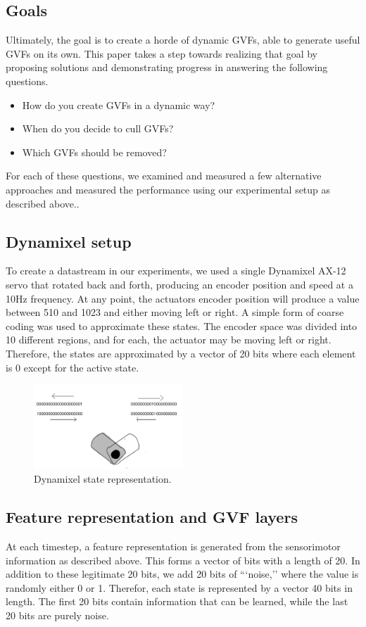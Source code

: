 \documentclass[letterpaper]{article}
\begin{document}
\subsection{Goals}
Ultimately, the goal is to create a horde of dynamic GVFs, able to generate useful GVFs on its own. This paper takes a step towards realizing that goal by proposing solutions and demonstrating progress in answering the following questions.
\begin{itemize}
  \item How do you create GVFs in a dynamic way?
  \item When do you decide to cull GVFs?
  \item Which GVFs should be removed?
\end{itemize}

For each of these questions, we examined and measured a few alternative approaches and measured the performance using our experimental setup as described above..

\subsection{Dynamixel setup}
To create a datastream in our experiments, we used a single Dynamixel AX-12 servo that rotated back and forth, producing an encoder position and speed at a 10Hz frequency. At any point, the actuators encoder position will produce a value between 510 and 1023 and either moving left or right. A simple form of coarse coding was used to approximate these states. The encoder space was divided into 10 different regions, and for each, the actuator may be moving left or right. Therefore, the states are approximated by a vector of 20 bits where each element is 0 except for the active state. 


\begin{figure}[H]
  \centerline{\includegraphics[width=0.5\textwidth]{Images/DynamixelFeatures.png}}
  \caption{Dynamixel state representation.}
  \label{fig:dynamixel}
\end{figure}

\subsection{Feature representation and GVF layers}
At each timestep, a feature representation is generated from the sensorimotor information as described above. This forms a vector of bits with a length of 20. In addition to these legitimate 20 bits, we add 20 bits of ```noise,'' where the value is randomly either 0 or 1. Therefor, each state is represented by a vector 40 bits in length. The first 20 bits contain information that can be learned, while the last 20 bits are purely noise. 
\end{document}

